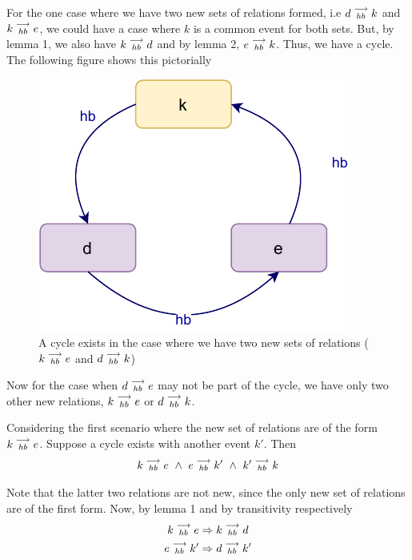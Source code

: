     For the one case where we have two new sets of relations formed, i.e $d\stackrel{\longrightarrow}{_{hb}}k$ and $k\stackrel{\longrightarrow}{_{hb}}e$, we could have a case where $k$ is a common event for both sets. But, by lemma 1, we also have $k\stackrel{\longrightarrow}{_{hb}}d$ and by lemma 2, $e\stackrel{\longrightarrow}{_{hb}}k$. Thus, we have a cycle. The following figure shows this pictorially

    \begin{figure}[H]
        \centering
        \includegraphics[scale=0.7]{InstructionReordering/ValidReorderingProof/ProofParts/Part3/part3(d).pdf}
        \caption{A cycle exists in the case where we have two new sets of relations ($k\stackrel{\longrightarrow}{_{hb}}e$ and $d\stackrel{\longrightarrow}{_{hb}}k$) }
        \label{fig:my_label}
    \end{figure}



    Now for the case when $d\stackrel{\longrightarrow}{_{hb}}e$ may not be part of the cycle, we have only two other new relations, $k\stackrel{\longrightarrow}{_{hb}}e$ or $d\stackrel{\longrightarrow}{_{hb}}k$.

    Considering the first scenario where the new set of relations are of the form $k\stackrel{\longrightarrow}{_{hb}}e$. Suppose a cycle exists with another event $k'$. Then 
    \[
        k\stackrel{\longrightarrow}{_{hb}}e \ \wedge \
        e\stackrel{\longrightarrow}{_{hb}}k' \ \wedge \
        k'\stackrel{\longrightarrow}{_{hb}}k
    \]

    Note that the latter two relations are not new, since the only new set of relations are of the first form. Now, by lemma 1 and by transitivity respectively
    \begin{gather*}
        k\stackrel{\longrightarrow}{_{hb}}e \Rightarrow k\stackrel{\longrightarrow}{_{hb}}d \\
        e\stackrel{\longrightarrow}{_{hb}}k' \Rightarrow d\stackrel{\longrightarrow}{_{hb}}k'    
    \end{gather*}

